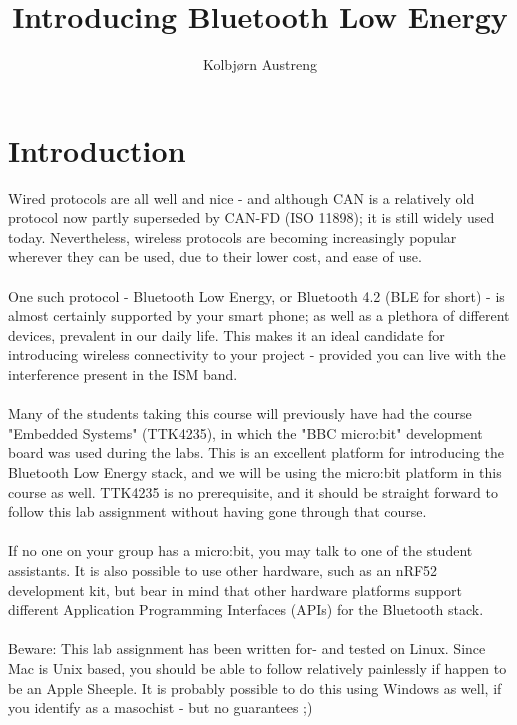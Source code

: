 \documentclass[11pt,a4paper]{article}
\title{Introducing Bluetooth Low Energy}
\author{Kolbjørn Austreng}
\date{}
\begin{document}
\maketitle

\renewcommand{\thesection}{\roman{section}}
\renewcommand{\thesubsection}{\roman{section}.\alph{subsection}}

\section{Introduction}
Wired protocols are all well and nice - and although CAN is a relatively old protocol now partly superseded by CAN-FD (ISO 11898); it is still widely used today. Nevertheless, wireless protocols are becoming increasingly popular wherever they can be used, due to their lower cost, and ease of use.\\
\\
One such protocol - Bluetooth Low Energy, or Bluetooth 4.2 (BLE for short) - is almost certainly supported by your smart phone; as well as a plethora of different devices, prevalent in our daily life. This makes it an ideal candidate for introducing wireless connectivity to your project - provided you can live with the interference present in the ISM band.\\
\\
Many of the students taking this course will previously have had the course "Embedded Systems" (TTK4235), in which the "BBC micro:bit" development board was used during the labs. This is an excellent platform for introducing the Bluetooth Low Energy stack, and we will be using the micro:bit platform in this course as well. TTK4235 is no prerequisite, and it should be straight forward to follow this lab assignment without having gone through that course.\\
\\
If no one on your group has a micro:bit, you may talk to one of the student assistants. It is also possible to use other hardware, such as an nRF52 development kit, but bear in mind that other hardware platforms support different Application Programming Interfaces (APIs) for the Bluetooth stack.\\
\\
Beware: This lab assignment has been written for- and tested on Linux. Since Mac is Unix based, you should be able to follow relatively painlessly if happen to be an Apple Sheeple. It is probably possible to do this using Windows as well, if you identify as a masochist - but no guarantees ;)
\end{document}
